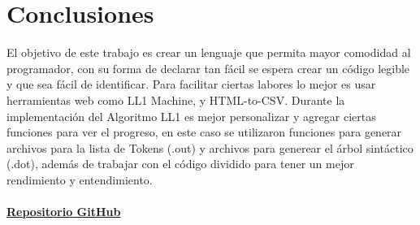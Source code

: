 \documentclass[https://www.overleaf.com/project/63761df255a8a9f4a15c3579
	letterpaper, %
	10pt, %
]{CSUniSchoolLabReport}
\begin{document}
    \section{Conclusiones}
    
    El objetivo de este trabajo es crear un lenguaje que permita mayor comodidad al programador, con su forma de declarar tan fácil se espera crear un código legible y que sea fácil de identificar. Para facilitar ciertas labores lo mejor es usar herramientas web como LL1 Machine, y HTML-to-CSV.
    Durante la implementación del Algoritmo LL1 es mejor personalizar y agregar ciertas funciones para ver el progreso, en este caso se utilizaron funciones para generar archivos para la lista de Tokens (.out) y archivos para generear el árbol sintáctico (.dot), además de trabajar con el código dividido para tener un mejor rendimiento y entendimiento.\\\\

    \href{https://github.com/DAOBLUR/CompilersPractices/tree/main/partial} {\huge\faGithub \textbf{{Repositorio GitHub}} }
    
\end{document}
